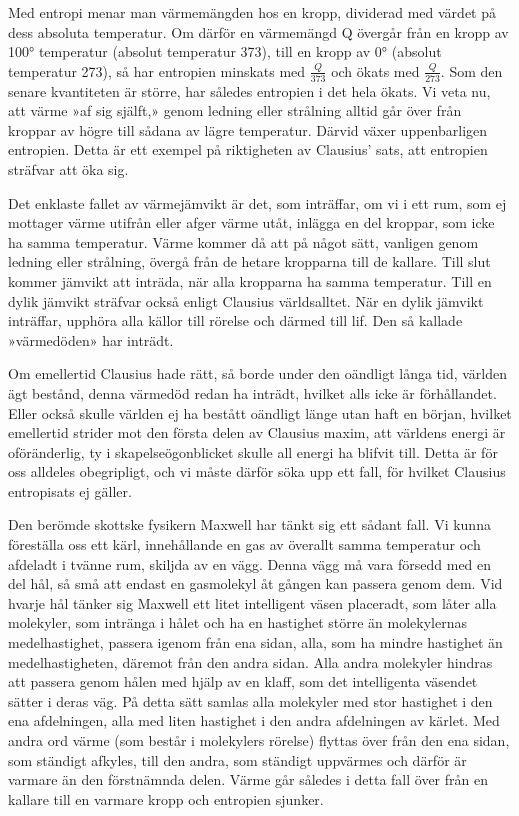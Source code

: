 \documentclass[a4paper, 12pt, oneside, swedish]{article}
\begin{document}
Med entropi menar man värmemängden hos en kropp, dividerad med värdet på dess absoluta temperatur. Om därför en värmemängd Q övergår från en kropp av 100° temperatur (absolut temperatur 373), till en kropp av 0° (absolut temperatur 273), så har entropien minskats med $\frac{Q}{373}$ och ökats med $\frac{Q}{273}$. Som den senare kvantiteten är större, har således entropien i det hela ökats. Vi veta nu, att värme »af sig själft,» genom ledning eller strålning alltid går över från kroppar av högre till sådana av lägre temperatur. Därvid växer uppenbarligen entropien. Detta är ett exempel på riktigheten av Clausius' sats, att entropien sträfvar att öka sig.

Det enklaste fallet av värmejämvikt är det, som inträffar, om vi i ett rum, som ej mottager värme utifrån eller afger värme utåt, inlägga en del kroppar, som icke ha samma temperatur. Värme kommer då att på något sätt, vanligen genom ledning eller strålning, övergå från de hetare kropparna till de kallare. Till slut kommer jämvikt att inträda, när alla kropparna ha samma temperatur. Till en dylik jämvikt sträfvar också enligt Clausius världsalltet. När en dylik jämvikt inträffar, upphöra alla källor till rörelse och därmed till lif. Den så kallade »värmedöden» har inträdt.

Om emellertid Clausius hade rätt, så borde under den oändligt långa tid, världen ägt bestånd, denna värmedöd redan ha inträdt, hvilket alls icke är förhållandet. Eller också skulle världen ej ha bestått oändligt länge utan haft en början, hvilket emellertid strider mot den första delen av Clausius maxim, att världens energi är oföränderlig, ty i skapelseögonblicket skulle all energi ha blifvit till. Detta är för oss alldeles obegripligt, och vi måste därför söka upp ett fall, för hvilket Clausius entropisats ej gäller.

Den berömde skottske fysikern Maxwell har tänkt sig ett sådant fall. Vi kunna föreställa oss ett kärl, innehållande en gas av överallt samma temperatur och afdeladt i tvänne rum, skiljda av en vägg. Denna vägg må vara försedd med en del hål, så små att endast en gasmolekyl åt gången kan passera genom dem. Vid hvarje hål tänker sig Maxwell ett litet intelligent väsen placeradt, som låter alla molekyler, som intränga i hålet och ha en hastighet större än molekylernas medelhastighet, passera igenom från ena sidan, alla, som ha mindre hastighet än medelhastigheten, däremot från den andra sidan. Alla andra molekyler hindras att passera genom hålen med hjälp av en klaff, som det intelligenta väsendet sätter i deras väg. På detta sätt samlas alla molekyler med stor hastighet i den ena afdelningen, alla med liten hastighet i den andra afdelningen av kärlet. Med andra ord värme (som består i molekylers rörelse) flyttas över från den ena sidan, som ständigt afkyles, till den andra, som ständigt uppvärmes och därför är varmare än den förstnämnda delen. Värme går således i detta fall över från en kallare till en varmare kropp och entropien sjunker.
\end{document}
